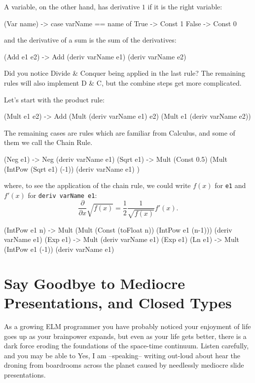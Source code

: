 \documentclass[12pt]{amsbook}
\begin{document}
A variable, on the other hand, has derivative $1$ if it is the right variable:
\vspace{-12pt}
\begin{code}
      (Var name) -> case varName == name of
                      True  -> Const 1
                      False -> Const 0
\end{code}
and the derivative of a sum is the sum of the derivatives:
\vspace{-12pt}
\begin{code}
      (Add e1 e2) -> Add (deriv varName e1) (deriv varName e2)
\end{code}
Did you notice Divide \& Conquer being applied in the last rule?  
The remaining rules will also implement D \& C,
but the combine steps get more complicated.

Let's start with the product rule:
\vspace{-12pt}
\begin{code}
      (Mult e1 e2) -> Add (Mult (deriv varName e1) e2) 
                          (Mult e1 (deriv varName e2))
\end{code}
The remaining cases are rules which are familiar from Calculus,
and some of them we call the Chain Rule.
\vspace{-12pt}
\begin{code}
      (Neg e1) -> Neg (deriv varName e1)
      (Sqrt e1) -> Mult (Const 0.5) (Mult (IntPow (Sqrt e1) (-1))
                                          (deriv varName e1)
                                    )
\end{code}
where, to see the application of the chain rule, we could write
$f(x)$ for \verb|e1| and $f'(x)$ for \verb|deriv varName e1|:
$$ \frac{\partial}{\partial x} \sqrt{f(x)} = \frac12 \frac{1}{\sqrt{f(x)}} f'(x).$$ 
\vspace{-12pt}
\begin{code}
      (IntPow e1 n) ->  Mult (Mult (Const (toFloat n)) (IntPow e1 (n-1)))
                             (deriv varName e1)
      (Exp e1) -> Mult (deriv varName e1) (Exp e1)
      (Ln e1) -> Mult (IntPow e1 (-1))
                      (deriv varName e1)
\end{code}

\chapter{Say Goodbye to Mediocre Presentations, and Closed Types}
%
As a growing ELM programmer you have probably noticed your enjoyment of life goes up as your brainpower expands,
but even as your life gets better, 
there is a dark force eroding the foundations of the space-time continuum.
Listen carefully, and you may be able to 
Yes, I am --speaking-- writing out-loud about hear the droning from boardrooms across the planet caused by needlessly mediocre slide presentations.
\end{document}
